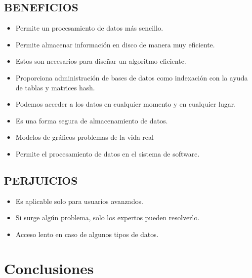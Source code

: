 \documentclass[twoside,twocolumn]{article}
\begin{document}
\subsection{BENEFICIOS}
\begin{itemize}
	\item Permite un procesamiento de datos más sencillo.
	\item Permite almacenar información en disco de manera muy eficiente.
	\item Estos son necesarios para diseñar un algoritmo eficiente.
	\item Proporciona administración de bases de datos como indexación con la ayuda de tablas y matrices hash.
	\item Podemos acceder a los datos en cualquier momento y en cualquier lugar.
	\item Es una forma segura de almacenamiento de datos.
	\item Modelos de gráficos problemas de la vida real 
	\item Permite el procesamiento de datos en el sistema de software.
\end{itemize}

\subsection{PERJUICIOS}

\begin{itemize}	
\item Es aplicable solo para usuarios avanzados.
\item Si surge algún problema, solo los expertos pueden resolverlo.
\item Acceso lento en caso de algunos tipos de datos.
\end{itemize}

\section{Conclusiones}
\end{document}
